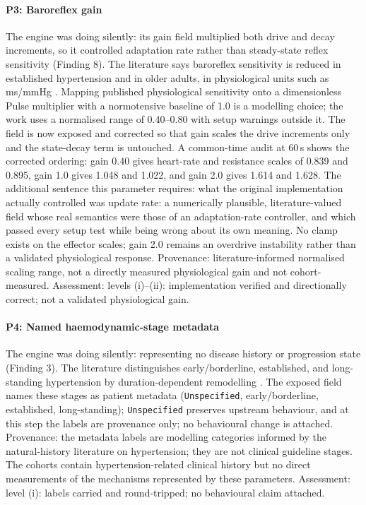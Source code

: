 \documentclass[preprint,12pt,nopreprintline]{elsarticle}
\begin{document}
\paragraph{P3: Baroreflex gain} The engine was doing silently: its gain field multiplied both drive and decay increments, so it controlled adaptation rate rather than steady-state reflex sensitivity (Finding 8). The literature says baroreflex sensitivity is reduced in established hypertension and in older adults, in physiological units such as ms/mmHg \cite{bristow1969,james1996}. Mapping published physiological sensitivity onto a dimensionless Pulse multiplier with a normotensive baseline of 1.0 is a modelling choice; the work uses a normalised range of 0.40--0.80 with setup warnings outside it. The field is now exposed and corrected so that gain scales the drive increments only and the state-decay term is untouched. A common-time audit at 60\,s shows the corrected ordering: gain 0.40 gives heart-rate and resistance scales of 0.839 and 0.895, gain 1.0 gives 1.048 and 1.022, and gain 2.0 gives 1.614 and 1.628. The additional sentence this parameter requires: what the original implementation actually controlled was update rate: a numerically plausible, literature-valued field whose real semantics were those of an adaptation-rate controller, and which passed every setup test while being wrong about its own meaning. No clamp exists on the effector scales; gain 2.0 remains an overdrive instability rather than a validated physiological response. Provenance: literature-informed normalised scaling range, not a directly measured physiological gain and not cohort-measured. Assessment: levels (i)--(ii): implementation verified and directionally correct; not a validated physiological gain.

\paragraph{P4: Named haemodynamic-stage metadata} The engine was doing silently: representing no disease history or progression state (Finding 3). The literature distinguishes early/borderline, established, and long-standing hypertension by duration-dependent remodelling \cite{lundjohansen1991}. The exposed field names these stages as patient metadata (\texttt{Unspecified}, early/borderline, established, long-standing); \texttt{Unspecified} preserves upstream behaviour, and at this step the labels are provenance only; no behavioural change is attached. Provenance: the metadata labels are modelling categories informed by the natural-history literature on hypertension; they are not clinical guideline stages. The cohorts contain hypertension-related clinical history but no direct measurements of the mechanisms represented by these parameters. Assessment: level (i): labels carried and round-tripped; no behavioural claim attached.
\end{document}
